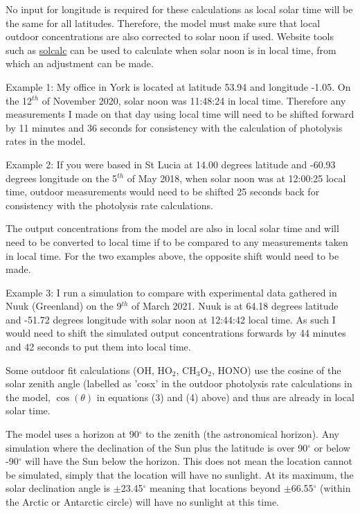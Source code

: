 \documentclass[a4paper]{refart}
\begin{document}
\label{Outdoor concentrations and time}

No input for longitude is required for these calculations as local solar time will be the same for all latitudes. Therefore, the model must make sure that local outdoor concentrations are also corrected to solar noon if used. Website tools such as \href{https://www.esrl.noaa.gov/gmd/grad/solcalc/}{solcalc} can be used to calculate when solar noon is in local time, from which an adjustment can be made.

Example 1: My office in York is located at latitude 53.94 and longitude -1.05. On the 12$^{th}$ of November 2020, solar noon was 11:48:24 in local time. Therefore any measurements I made on that day using local time will need to be shifted forward by 11 minutes and 36 seconds for consistency with the calculation of photolysis rates in the model.

Example 2: If you were based in St Lucia at 14.00 degrees latitude and -60.93 degrees longitude on the 5$^{th}$ of May 2018, when solar noon was at 12:00:25 local time, outdoor measurements would need to be shifted 25 seconds back for consistency with the photolysis rate calculations.

The output concentrations from the model are also in local solar time and will need to be converted to local time if to be compared to any measurements taken in local time. For the two examples above, the opposite shift would need to be made.

Example 3: I run a simulation to compare with experimental data gathered in Nuuk (Greenland) on the 9$^{th}$ of March 2021. Nuuk is at 64.18 degrees latitude and -51.72 degrees longitude with solar noon at 12:44:42 local time. As such I would need to shift the simulated output concentrations forwards by 44 minutes and 42 seconds to put them into local time.

Some outdoor fit calculations (OH, HO$_2$, CH$_3$O$_2$, HONO) use the cosine of the solar zenith angle (labelled as 'cosx' in the outdoor photolysis rate calculations in the model, $\cos(\theta)$ in equations (3) and (4) above) and thus are already in local solar time.


The model uses a horizon at 90$^{\circ}$ to the zenith (the astronomical horizon). Any simulation where the declination of the Sun plus the latitude is over 90$^{\circ}$ or below -90$^{\circ}$ will have the Sun below the horizon. This does not mean the location cannot be simulated, simply that the location will have no sunlight. At its maximum, the solar declination angle is $\pm$23.45$^{\circ}$ meaning that locations beyond $\pm$66.55$^{\circ}$ (within the Arctic or Antarctic circle) will have no sunlight at this time.
\end{document}
